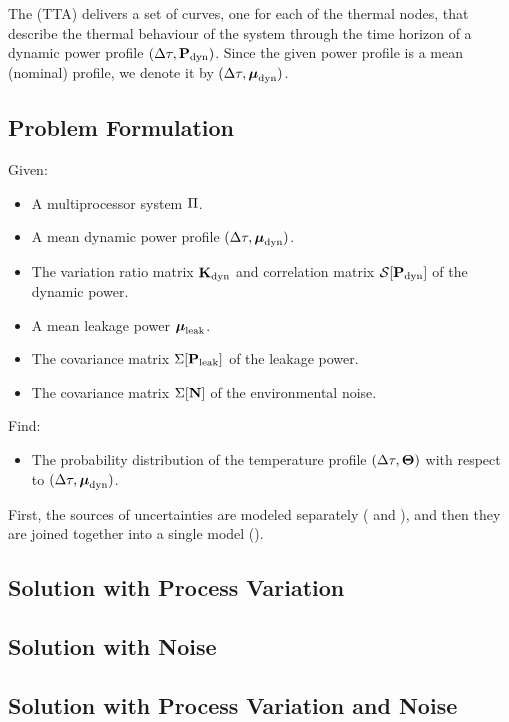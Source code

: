 The  (TTA) delivers a set of curves, one for each of the thermal nodes, that describe the thermal behaviour of the system through the time horizon of a dynamic power profile $(\Delta \tau, \mathbf{P}_{\text{dyn}})$. Since the given power profile is a mean (nominal) profile, we denote it by $(\Delta \tau, \boldsymbol\mu_{\text{dyn}})$.

\subsection{Problem Formulation}
Given:
\begin{itemize}
  \item A multiprocessor system $\Pi$.
  \item A mean dynamic power profile $(\Delta \tau, \boldsymbol\mu_{\text{dyn}})$.
  \item The variation ratio matrix $\mathbf{K}_{\text{dyn}}$ and correlation matrix $\mathcal{S}[{\mathbf{P}_{\text{dyn}}}]$ of the dynamic power.
  \item A mean leakage power $\boldsymbol\mu_{\text{leak}}$.
  \item The covariance matrix $\Sigma[\mathbf{P}_{\text{leak}}]$ of the leakage power.
  \item The covariance matrix $\Sigma[\mathbf{N}]$ of the environmental noise.
\end{itemize}

Find:
\begin{itemize}
  \item The probability distribution of the temperature profile $(\Delta \tau, \mathbf{\Theta})$ with respect to $(\Delta \tau, \boldsymbol\mu_{\text{dyn}})$.
\end{itemize}

First, the sources of uncertainties are modeled separately ( and ), and then they are joined together into a single model ().

\subsection{Solution with Process Variation} 


\subsection{Solution with Noise} 


\subsection{Solution with Process Variation and Noise} 

